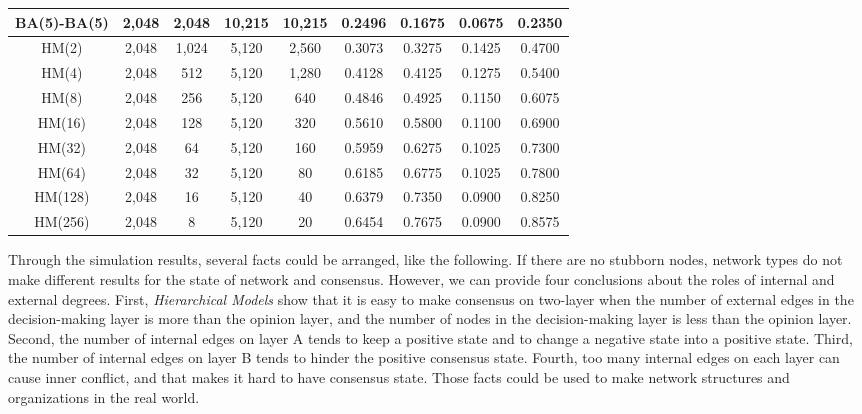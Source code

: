 \begin{table}[!htb]
\begin{center}
\begin{tabular}{c|c|c|c|c|c|c|c|c}
			BA(5)-BA(5)            & 2,048 	& 2,048   & 10,215  & 10,215  &  0.2496   & 0.1675 & 0.0675 & 0.2350   \\ \hline
			HM(2)  				   & 2,048 	& 1,024   & 5,120   & 2,560   &  0.3073   & 0.3275 & 0.1425 & 0.4700   \\ \hline    
			HM(4) 				   & 2,048 	&  512    & 5,120   & 1,280   &  0.4128   & 0.4125 & 0.1275 & 0.5400   \\ \hline
			HM(8)  				   & 2,048 	&  256    & 5,120   & 640     &  0.4846   & 0.4925 & 0.1150 & 0.6075   \\ \hline
			HM(16)				   & 2,048 	&  128    & 5,120   & 320     &  0.5610   & 0.5800 & 0.1100 & 0.6900   \\ \hline
			HM(32) 				   & 2,048 	&   64    & 5,120   & 160     &  0.5959   & 0.6275 & 0.1025 & 0.7300   \\ \hline
			HM(64) 				   & 2,048 	&   32    & 5,120   & 80      &  0.6185   & 0.6775 & 0.1025 & 0.7800   \\ \hline 
			HM(128) 			   & 2,048 	&   16    & 5,120   & 40      &  0.6379   & 0.7350 & 0.0900 & 0.8250   \\ \hline 
			HM(256) 			   & 2,048 	&    8    & 5,120   & 20      &  0.6454   & 0.7675 & 0.0900 & 0.8575   \\ \hline 
			 \hline
		\end{tabular}
	\end{center}
\end{table} 

Through the simulation results, several facts could be arranged, like the following. If there are no stubborn nodes, network types do not make different results for the state of network and consensus. However, we can provide four conclusions about the roles of internal and external degrees. First, \textit{Hierarchical Models} show that it is easy to make consensus on two-layer when the number of external edges in the decision-making layer is more than the opinion layer, and the number of nodes in the decision-making layer is less than the opinion layer. Second, the number of internal edges on layer A tends to keep a positive state and to change a negative state into a positive state. Third, the number of internal edges on layer B tends to hinder the positive consensus state. Fourth, too many internal edges on each layer can cause inner conflict, and that makes it hard to have consensus state. Those facts could be used to make network structures and organizations in the real world. \\
